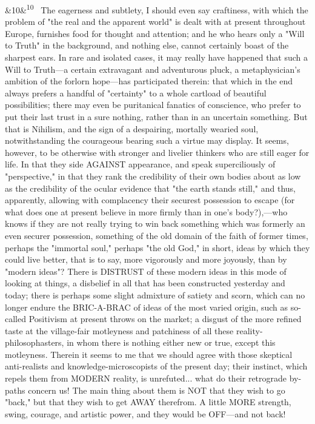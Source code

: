 \documentclass[12pt]{article}
\newcommand{\para}[1][]{\par\noindent\ifx&#1&\else\textsuperscript{\footnotesize #1}~\fi}
\begin{document}
\para[10] The eagerness and subtlety, I should even say craftiness, with which the problem of "the real and the apparent world" is dealt with at present throughout Europe, furnishes food for thought and attention; and he who hears only a "Will to Truth" in the background, and nothing else, cannot certainly boast of the sharpest ears. In rare and isolated cases, it may really have happened that such a Will to Truth---a certain extravagant and adventurous pluck, a metaphysician's ambition of the forlorn hope---has participated therein: that which in the end always prefers a handful of "certainty" to a whole cartload of beautiful possibilities; there may even be puritanical fanatics of conscience, who prefer to put their last trust in a sure nothing, rather than in an uncertain something. But that is Nihilism, and the sign of a despairing, mortally wearied soul, notwithstanding the courageous bearing such a virtue may display. It seems, however, to be otherwise with stronger and livelier thinkers who are still eager for life. In that they side AGAINST appearance, and speak superciliously of "perspective," in that they rank the credibility of their own bodies about as low as the credibility of the ocular evidence that "the earth stands still," and thus, apparently, allowing with complacency their securest possession to escape (for what does one at present believe in more firmly than in one's body?),---who knows if they are not really trying to win back something which was formerly an even securer possession, something of the old domain of the faith of former times, perhaps the "immortal soul," perhaps "the old God," in short, ideas by which they could live better, that is to say, more vigorously and more joyously, than by "modern ideas"? There is DISTRUST of these modern ideas in this mode of looking at things, a disbelief in all that has been constructed yesterday and today; there is perhaps some slight admixture of satiety and scorn, which can no longer endure the BRIC-A-BRAC of ideas of the most varied origin, such as so-called Positivism at present throws on the market; a disgust of the more refined taste at the village-fair motleyness and patchiness of all these reality-philosophasters, in whom there is nothing either new or true, except this motleyness. Therein it seems to me that we should agree with those skeptical anti-realists and knowledge-microscopists of the present day; their instinct, which repels them from MODERN reality, is unrefuted... what do their retrograde by-paths concern us! The main thing about them is NOT that they wish to go "back," but that they wish to get AWAY therefrom. A little MORE strength, swing, courage, and artistic power, and they would be OFF---and not back!
\end{document}
